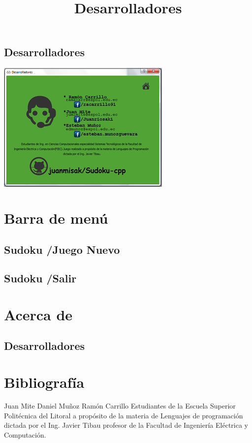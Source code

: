 \documentclass[11pt]{book} %
\begin{document}
\subsection{Desarrolladores}
\includegraphics{pagdesa.png}
\section{Barra de menú}
\subsection{Sudoku /Juego Nuevo}
\subsection{Sudoku /Salir}
\section{Acerca de}
\subsection{Desarrolladores}
\section{Bibliografía}

\title{Desarrolladores}
\maketitle
		Juan Mite 
		Daniel Muñoz
		Ramón Carrillo
	Estudiantes de la Escuela Superior Politécnica del Litoral a propósito de la materia de Lenguajes de programación dictada por el Ing. Javier Tibau profesor de la Facultad de Ingeniería Eléctrica y Computación.  
\end{document}

